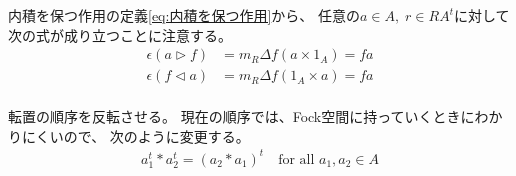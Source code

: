 		内積を保つ作用の定義\ref{eq:内積を保つ作用}から、
		任意の$a\in A,\;r\in RA^t$に対して次の式が成り立つことに注意する。
		\begin{equation}\begin{split} %
			\epsilon(a\rhd f) &= m_R\Delta f(a\times 1_A) = fa \\
			\epsilon(f\lhd a) &= m_R\Delta f(1_A\times a) = fa \\
		\end{split}\end{equation} %

		\begin{todo}[順序の変更]\label{todo:順序の変更} %
			転置の順序を反転させる。
			現在の順序では、Fock空間に持っていくときにわかりにくいので、
			次のように変更する。
			\begin{equation}\begin{split} %
				a_1^t*a_2^t = (a_2*a_1)^t \quad\text{for all }a_1,a_2\in A
			\end{split}\end{equation} %
		\end{todo} %

